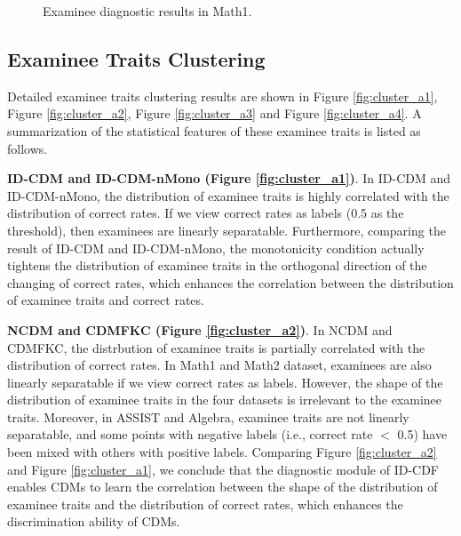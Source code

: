 \documentclass[sigconf]{acmart}
\begin{document}
\begin{figure}[t]
  \centering 
  \vspace{-5pt}
  \caption{Examinee diagnostic results in Math1.}\label{fig:case}
  \vspace{-10pt}
\end{figure}


\subsection{Examinee Traits Clustering}\label{app:etc}
\par Detailed examinee traits clustering results are shown in Figure \ref{fig:cluster_a1}, Figure \ref{fig:cluster_a2}, Figure \ref{fig:cluster_a3} and Figure \ref{fig:cluster_a4}. A summarization of the statistical features of these examinee traits is listed as follows.
\par \textbf{ID-CDM and ID-CDM-nMono (Figure \ref{fig:cluster_a1})}. In ID-CDM and ID-CDM-nMono, the distribution of examinee traits is highly correlated with the distribution of correct rates. If we view correct rates as labels (0.5 as the threshold), then examinees are linearly separatable. Furthermore, comparing the result of ID-CDM and ID-CDM-nMono, the monotonicity condition actually tightens the distribution of examinee traits in the orthogonal direction of the changing of correct rates, which enhances the correlation between the distribution of examinee traits and correct rates.
\par \textbf{NCDM and CDMFKC (Figure \ref{fig:cluster_a2})}. In NCDM and CDMFKC, the distrbution of examinee traits is partially correlated with the distribution of correct rates. In Math1 and Math2 dataset, examinees are also linearly separatable if we view correct rates as labels. However, the shape of the distribution of examinee traits in the four datasets is irrelevant to the examinee traits. Moreover, in ASSIST and Algebra, examinee traits are not linearly separatable, and some points with negative labels (i.e., correct rate $<$ 0.5) have been mixed with others with positive labels. Comparing Figure \ref{fig:cluster_a2} and Figure \ref{fig:cluster_a1}, we conclude that the diagnostic module of ID-CDF enables CDMs to learn the correlation between the shape of the distribution of examinee traits and the distribution of correct rates, which enhances the discrimination ability of CDMs.
\end{document}
